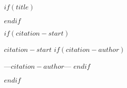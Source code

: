 $if(title)$
\maketitle
$endif$

$if(citation-start)$
\newpage{}
\thispagestyle {empty}
    
    \vspace*{2cm}
    
    \begin{center}
        \Large{\parbox{12cm}{
            \begin{raggedright}
            {\Large 
                \textit{$citation-start$}
            }
$if(citation-author)$
\par
            \vspace{.5cm}\hfill{---$citation-author$---}
$endif$
            \end{raggedright}
        }
    }
    \end{center}
    
    \newpage
$endif$
\setcounter{page}{1}
